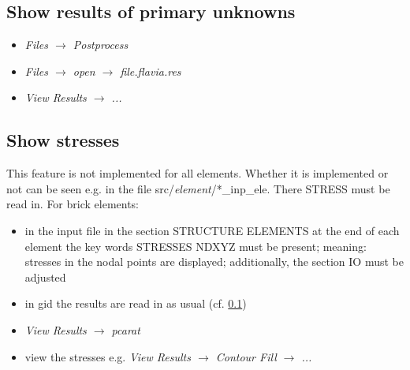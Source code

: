 \subsection{Show results of primary unknowns}\label{tut_struct:sec:show-results}

\begin{itemize}
\item \emph{Files $\rightarrow$ Postprocess}
\item \emph{Files $\rightarrow$ open $\rightarrow$ file.flavia.res}
\item \emph{View Results $\rightarrow$ ...}
\end{itemize}

\subsection{Show stresses}\label{tut_struct:sec:show-stresses}

This feature is not implemented for all elements. Whether it is implemented
or not can be seen e.g. in the file src/\emph{element}/{*}\_inp\_ele.
There STRESS must be read in. For brick elements: 

\begin{itemize}
\item in the input file in the section STRUCTURE ELEMENTS at the end of
each element the key words STRESSES NDXYZ must be present; meaning:
stresses in the nodal points are displayed; additionally, the section
IO must be adjusted 
\item in gid the results are read in as usual (cf. \ref{tut_struct:sec:show-results}) 
\item \emph{View Results $\rightarrow$ pcarat}
\item view the stresses e.g. \emph{View Results $\rightarrow$ Contour Fill
$\rightarrow$ ...}
\end{itemize}


